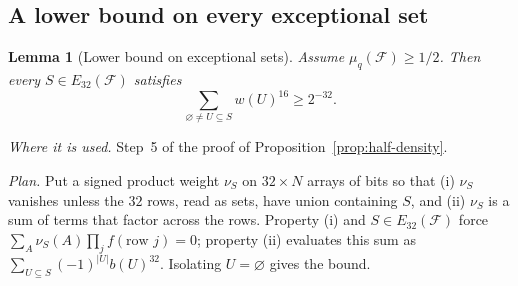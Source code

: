 \documentclass[11pt,letterpaper]{article}
\newtheorem{lemma}[theorem]{Lemma}
\theoremstyle{definition}
\theoremstyle{remark}
\numberwithin{equation}{section}
\begin{document}
\subsection{A lower bound on every exceptional set}

\begin{lemma}[Lower bound on exceptional sets]\label{lem:exceptional}
Assume $\mu_q(\mathcal F)\ge1/2$. Then every $S\in E_{32}(\mathcal F)$
satisfies
\begin{equation}\label{eq:exceptional-weight-bound}
 \sum_{\varnothing\ne U\subseteq S}w(U)^{16}\ge2^{-32}.
\end{equation}
\end{lemma}

\emph{Where it is used.} Step~5 of the proof of
Proposition~\ref{prop:half-density}.

\emph{Plan.} Put a signed product weight $\nu_S$ on $32\times N$ arrays of
bits so that (i) $\nu_S$ vanishes unless the $32$ rows, read as sets, have
union containing $S$, and (ii) $\nu_S$ is a sum of terms that factor
across the rows. Property (i) and $S\in E_{32}(\mathcal F)$ force
$\sum_A\nu_S(A)\prod_jf(\text{row }j)=0$; property (ii) evaluates this sum
as $\sum_{U\subseteq S}(-1)^{|U|}b(U)^{32}$. Isolating $U=\varnothing$
gives the bound.
\end{document}
